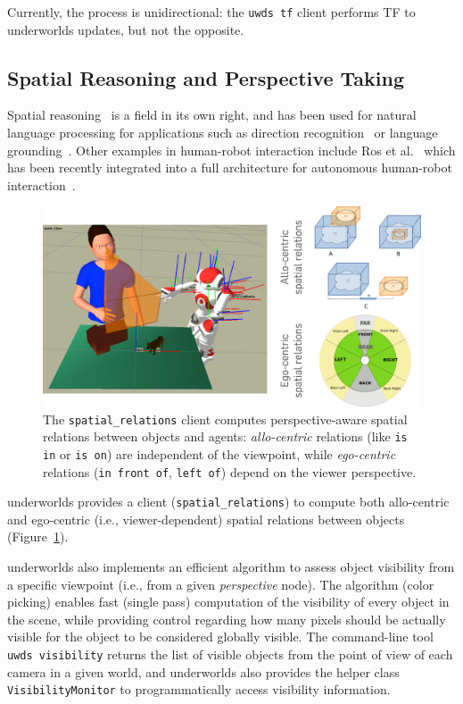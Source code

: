 \documentclass[letterpaper, 10 pt, conference]{ieeeconf}  %
\newcommand{\etal}{et al.\xspace}
\newcommand{\ie}{i.e.,\xspace}
\newcommand{\uwds}{{\sc underworlds}\xspace}
\begin{document}
Currently, the process is unidirectional: the {\tt uwds tf} client performs TF
to \uwds updates, but not the opposite.

\subsection{Spatial Reasoning and Perspective Taking}

Spatial reasoning~\cite{O'Keefe1999} is a field in its own right, and has been
used for natural language processing for applications such as direction
recognition~\cite{Kollar2010,Matuszek2010} or language
grounding~\cite{Tellex2010}. Other examples in human-robot interaction include Ros
\etal~\cite{ros2010solving, ros2010which} which has been recently integrated
into a full architecture for autonomous human-robot
interaction~\cite{lemaignan2016artificial}.

\begin{figure}
    \centering
    \includegraphics[width=\linewidth]{spatialrelations}
    \caption{The {\tt spatial\_relations} client computes perspective-aware
    spatial relations between objects and agents: \emph{allo-centric} relations (like
    {\tt is in} or {\tt is on}) are independent of the viewpoint, while
    \emph{ego-centric} relations ({\tt in front of}, {\tt left of}) depend on
    the viewer perspective.}
    \label{fig|spatialrelations}
\end{figure}

\uwds provides a client ({\tt spatial\_relations}) to compute both
allo-centric and ego-centric (\ie viewer-dependent) spatial relations
between objects (Figure~\ref{fig|spatialrelations}).


\uwds also implements an efficient algorithm to assess object visibility from a
specific viewpoint (\ie from a given \emph{perspective} node). The algorithm (color
picking) enables fast (single pass) computation of the visibility of every
object in the scene, while providing control regarding how many pixels should be
actually visible for the object to be considered globally visible. The
command-line tool {\tt uwds visibility} returns the list of visible objects from
the point of view of each camera in a given world, and \uwds also provides the
helper class {\tt VisibilityMonitor} to programmatically access visibility
information.
\end{document}
